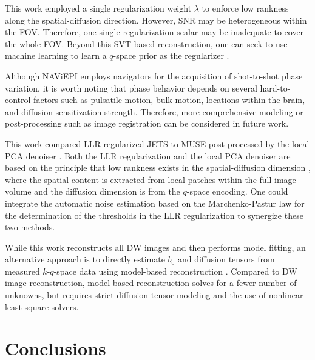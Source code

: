 \documentclass[preprint,12pt,authoryear,review]{elsarticle}
\begin{document}
    This work employed a single regularization weight $\lambda$
    to enforce low rankness along the spatial-diffusion direction.
    However, SNR may be heterogeneous within the FOV.
    Therefore, one single regularization scalar may be inadequate
    to cover the whole FOV.
    Beyond this SVT-based reconstruction,
    one can seek to use machine learning to
    learn a $q$-space prior as the regularizer
    \citep{hammernik_2018_varnet,lam_2019_mrsi,mani_2021_qmodel}.

    Although NAViEPI employs navigators for
    the acquisition of shot-to-shot phase variation,
    it is worth noting that phase behavior depends on
    several hard-to-control factors
    such as pulsatile motion, bulk motion,
    locations within the brain, and
    diffusion sensitization strength.
    Therefore, more comprehensive modeling or post-processing
    such as image registration can be considered in future work.

    This work compared LLR regularized JETS to
    MUSE post-processed by the local PCA denoiser
    \citep{cordero_2019_cplxdwi}.
    Both the LLR regularization and the local PCA denoiser
    are based on the principle that low rankness exists
    in the spatial-diffusion dimension \citep{moeller_2021_nordic},
    where the spatial content is extracted from local patches
    within the full image volume
    and the diffusion dimension is from the $q$-space encoding.
    One could integrate the automatic noise estimation
    based on the Marchenko-Pastur law for the determination of
    the thresholds in the LLR regularization
    to synergize these two methods.

    While this work reconstructs all DW images and
    then performs model fitting,
    an alternative approach is to directly estimate
    $b_0$ and diffusion tensors
    from measured $k$-$q$-space data
    using model-based reconstruction
    \citep{knoll_2015_mobadiff,dong_2018_mobadiff,shafieizargar_2023_adept}.
    Compared to DW image reconstruction,
    model-based reconstruction solves for a fewer number of unknowns,
    but requires strict diffusion tensor modeling
    and the use of nonlinear least square solvers.

    \section{Conclusions}
    \label{SEC:Conc}
\end{document}
